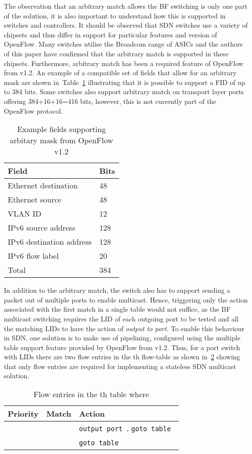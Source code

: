 \documentclass[conference]{IEEEtran}
\newcommand{\secref}[1]{\ref{#1}}
\newcommand{\tabref}[1]{Table~\ref{#1}}
\begin{document}
The observation that an arbitrary match allows the BF switching is only one part of the solution, it is also important to understand how this is supported in switches and controllers. It should be observed that SDN switches use a variety of chipsets and thus differ in support for particular features and version of OpenFlow. Many switches utilise the Broadcom range of ASICs and the authors of this paper have confirmed that the arbitrary match is supported in these chipsets. Furthermore, arbitrary match has been a required feature of OpenFlow from v1.2. An example of a compatible set of fields that allow for an arbitrary mask are shown in~\tabref{tab:arbitary} illustrating that it is possible to support a FID of up to 384 bits. Some switches also support arbitrary match on transport layer ports offering 384+16+16=416 bits, however, this is not currently part of the OpenFlow protocol.
\begin{table}[tb]
  \centering
  \caption{Example fields supporting arbitary mask from OpenFlow v1.2}
  \vspace{0.5em}
  \begin{tabular}{|l|l|}
    \hline
    Field & Bits\\
    \hline
    Ethernet destination & 48 \\
    Ethernet source & 48 \\
    VLAN ID & 12 \\
    IPv6 source address & 128 \\
    IPv6 destination address & 128 \\
    IPv6 flow label & 20 \\
    \hline
    Total & 384 \\
    \hline
  \end{tabular}
  \label{tab:arbitary}
\end{table}

In addition to the arbitrary match, the switch also has to support sending a packet out of multiple ports to enable multicast. Hence, triggering only the action associated with the first match in a single table would not suffice, as the BF multicast switching requires the LID of each outgoing port to be tested and all the matching LIDs to have the action of \emph{output to port}. To enable this behaviour in SDN, one solution is to make use of pipelining, configured using the multiple table support feature provided by OpenFlow from v1.2. Thus, for a  port switch with LIDs  there are two flow entries in the th flow-table as shown in~\secref{tab:tables} showing that only  flow entries are required for implementing a stateless SDN multicast solution. 
\begin{table}[tb]
  \centering
  \caption{Flow entries in the th table where }
  \label{tab:tables}
  \vspace{0.5em}
  \begin{tabular}{|l|l|l|}
    \hline
    Priority & Match & Action\\
    \hline
     &  & \texttt{output port}~, \texttt{goto table}~ \\
    \hline
     &  &\texttt{goto table}~ \\
    \hline
  \end{tabular}
\end{table}
\end{document}

